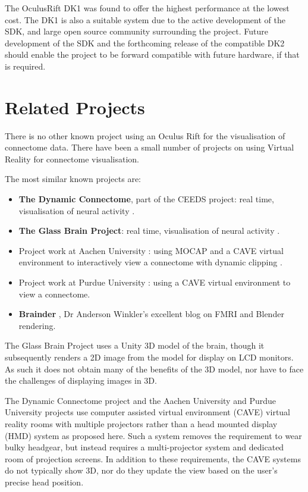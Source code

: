 \documentclass[MSc,paper=a4,pagesize=auto]{icldt}
\begin{document}
The OculusRift DK1 was found to offer the highest performance at the lowest cost. The DK1 is also a suitable system due to the active development of the SDK, and large open source community surrounding the project. Future development of the SDK and the forthcoming release of the compatible DK2 should enable the project to be forward compatible with future hardware, if that is required.
\section{Related Projects}
There is no other known project using an Oculus Rift for the visualisation of connectome data. There have been a small number of projects on using Virtual Reality for connectome visualisation. 

The most similar known projects are:
\begin{itemize}
  \item \textbf{The Dynamic Connectome}, part of the CEEDS project: real time, visualisation of neural activity \cite{ceeds2014}.
  \item \textbf{The Glass Brain Project}: real time, visualisation of neural activity \cite{GlassBrain2014}.
  \item Project work at Aachen University \cite{Rick2011}: using MOCAP and a CAVE virtual environment to interactively view a connectome with dynamic clipping \cite{ceeds2014}.
  \item Project work at Purdue University \cite{Chen2011}: using a CAVE virtual environment to view a connectome.
  \item \textbf{Brainder} \cite{brainder2014}, Dr Anderson Winkler’s excellent blog on FMRI and Blender rendering.
\end{itemize}


The Glass Brain Project uses a Unity 3D model of the brain, though it subsequently renders a 2D image from the model for display on LCD monitors. As such it does not obtain many of the benefits of the 3D model, nor have to face the challenges of displaying images in 3D.

The Dynamic Connectome project and the Aachen University and Purdue University projects use computer assisted virtual environment (CAVE) virtual reality rooms with multiple projectors rather than a head mounted display (HMD) system as proposed here. Such a system removes the requirement to wear bulky headgear, but instead requires a multi-projector system and dedicated room of projection screens. In addition to these requirements, the CAVE systems do not typically show 3D, nor do they update the view based on the user’s precise head position.
\end{document}
